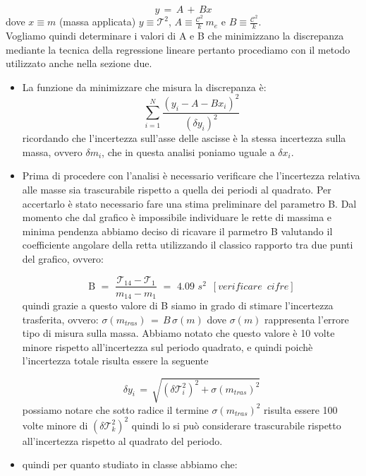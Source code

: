 \begin{equation}
	y \,=\, A \,+\, Bx
	\label{eq:pppar}
\end{equation}
%
dove $x \equiv m$ (massa applicata) $y \equiv \mathcal{T}^2$, $A \equiv \frac{\mathcal{C}^2}{k} \, m_e$ e $B \equiv \frac{\mathcal{C}^2}{k}$.\\
Vogliamo quindi determinare i valori di A e B che minimizzano la discrepanza mediante la tecnica della regressione lineare pertanto procediamo con il metodo utilizzato anche nella sezione due.
\begin{itemize}
\item{La funzione da minimizzare che misura la discrepanza è:
		\begin{equation*}
			\sum_{i=1}^{N} \frac{(y_i - A - Bx_i)^2}{(\delta y_i)^2}
		\end{equation*}
		ricordando che l'incertezza sull'asse delle ascisse è la stessa incertezza sulla massa, ovvero $\delta m_i$, che in questa analisi poniamo uguale a $\delta x_i$.}
\item{Prima di procedere con l'analisi è necessario verificare che l'incertezza relativa alle masse sia trascurabile rispetto a quella dei periodi al quadrato. Per accertarlo è stato necessario fare una stima preliminare del parametro B. Dal momento che dal grafico è impossibile individuare le rette di massima e minima pendenza abbiamo deciso di ricavare il parmetro B valutando il coefficiente angolare della retta utilizzando il classico rapporto tra due punti del grafico, ovvero:

	\begin{equation*}
		\text{B} \,\,=\,\, \frac{\mathcal{T}_{14} - \mathcal{T}_{1}}{m_{14} - m_1} \,\,=\,\, 4.09 \,\, s^2 \,\,\,[verificare \,\,\,cifre]
	\end{equation*}
	quindi grazie a questo valore di B siamo in grado di stimare l'incertezza trasferita, ovvero: $\sigma (m_{tras}) \,=\, B \, \sigma (m)$ dove $\sigma (m)$ rappresenta l'errore tipo di misura sulla massa. Abbiamo notato che questo valore è 10 volte minore rispetto all'incertezza sul periodo quadrato, e quindi poichè l'incertezza totale risulta essere la seguente
	
	\begin{equation*}
		\delta y_i \,=\, \sqrt{(\delta \mathcal{T}_i^2)^2 + \sigma (m_{tras})^2} 
	\end{equation*}	
	possiamo notare che sotto radice il termine $\sigma (m_{tras})^2$ risulta essere 100 volte minore di $(\delta \mathcal{T}_k^2)^2$ quindi lo si può considerare trascurabile rispetto all'incertezza rispetto al quadrato del periodo.
	}
\item{quindi per quanto studiato in classe abbiamo che:

}
\end{itemize}
